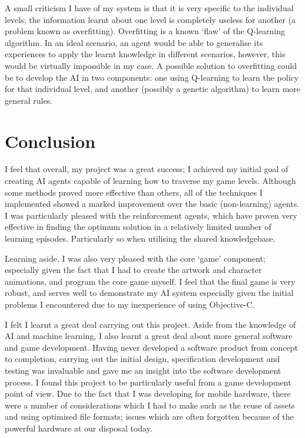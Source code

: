 \documentclass[a4paper,oneside]{report}
\begin{document}
A small criticism I have of my system is that it is very specific to the individual levels; the information learnt about one level is completely useless for another (a problem known as overfitting). Overfitting is a known `flaw' of the Q-learning algorithm. In an ideal scenario, an agent would be able to generalise its experiences to apply the learnt knowledge in different scenarios, however, this would be virtually impossible in my case. A possible solution to overfitting could be to develop the AI in two components: one using Q-learning to learn the policy for that individual level, and another (possibly a genetic algorithm) to learn more general rules. 

\section{Conclusion}

I feel that overall, my project was a great success; I achieved my initial goal of creating AI agents capable of learning how to traverse my game levels. Although some methods proved more effective than others, all of the techniques I implemented showed a marked improvement over the basic (non-learning) agents. I was particularly pleased with the reinforcement agents, which have proven very effective in finding the optimum solution in a relatively limited number of learning episodes. Particularly so when utilising the shared knowledgebase. 

Learning aside, I was also very pleased with the core `game' component; especially given the fact that I had to create the artwork and character animations, and program the core game myself. I feel that the final game is very robust, and serves well to demonstrate my AI system especially given the initial problems I encountered due to my inexperience of using Objective-C.

I felt I learnt a great deal carrying out this project. Aside from the knowledge of AI and machine learning, I also learnt a great deal about more general software and game development. Having never developed a software product from concept to completion, carrying out the initial design, specification development and testing was invaluable and gave me an insight into the software development process. I found this project to be particularly useful from a game development point of view. Due to the fact that I was developing for mobile hardware, there were a number of considerations which I had to make such as the reuse of assets and using optimised file formats; issues which are often forgotten because of the powerful hardware at our disposal today.
\end{document}
